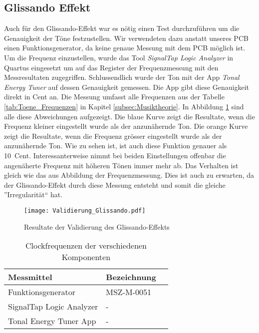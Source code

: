 \subsection{Glissando Effekt}\label{subsec:Glissando_Effekt}
Auch für den Glissando-Effekt war es nötig einen Test durchzuführen um die Genauigkeit der Töne festzustellen. Wir verwendeten dazu anstatt unseres PCB einen Funktionsgenerator, da keine genaue Messung mit dem PCB möglich ist. Um die Frequenz einzustellen, wurde das Tool \textit{SignalTap Logic Analyzer} in Quartus eingesetzt um auf das Register der Frequenzmessung mit den Messresultaten zugegriffen. Schlussendlich wurde der Ton mit der App \textit{Tonal Energy Tuner} auf dessen Genauigkeit gemessen. Die App gibt diese Genauigkeit direkt in Cent an. Die Messung umfasst alle Frequenzen aus der Tabelle \ref{tab:Toene_Frequenzen} in Kapitel \ref{subsec:Musiktheorie}. In Abbildung \ref{img:Validierung_Glissando} sind alle diese Abweichungen aufgezeigt. Die blaue Kurve  zeigt die Resultate, wenn die Frequenz kleiner eingestellt wurde als der anzunähernde Ton. Die orange Kurve zeigt die Resultate, wenn die Frequenz grösser eingestellt wurde als der anzunähernde Ton. Wie zu sehen ist, ist auch diese Funktion genauer als \SI{10}{Cent}. Interessanterweise nimmt bei beiden Einstellungen offenbar die angenäherte Frequenz mit höheren Tönen immer mehr ab. Das Verhalten ist gleich wie das aus Abbildung  der Frequenzmessung. Dies ist auch zu erwarten, da der Glissando-Effekt durch diese Messung entsteht und somit die gleiche ''Irregularität`` hat.


\begin{figure}[h!]
	\centering
	\texttt{[image: Validierung\_Glissando.pdf]}
	\caption{Resultate der Validierung des Glissando-Effekts} 
	\label{img:Validierung_Glissando}
\end{figure}  

\begin{table}[H]
	\centering
	\caption{Clockfrequenzen der verschiedenen Komponenten}
	\label{tab:clocks}
	\begin{tabular}{l|l|l}
		\textbf{Messmittel} & \textbf{Bezeichnung} \\
		\hline\hline
		Funktionsgenerator & MSZ-M-0051   \\ \hline
		SignalTap Logic Analyzer & -    \\ \hline
		Tonal Energy Tuner App &  -   \\ \hline
		
	\end{tabular}
\end{table}


